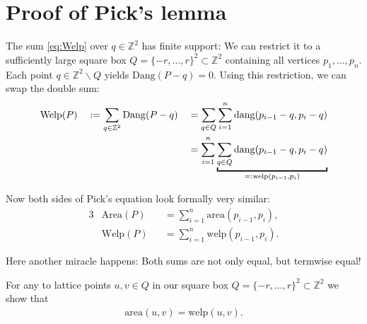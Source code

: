 \documentclass[a4paper]{amsart}
\numberwithin{equation}{section}
\theoremstyle{plain}
\theoremstyle{definition}
\newcommand{\Z}{\mathbb{Z}}
\newcommand{\minus}{\smallsetminus}
\newcommand{\area}{\mathrm{area}}
\newcommand{\Area}{\mathrm{Area}}
\newcommand{\dang}{\mathrm{dang}}
\newcommand{\Dang}{\mathrm{Dang}}
\newcommand{\welp}{\mathrm{welp}}
\newcommand{\Welp}{\mathrm{Welp}}
\begin{document}
\section{Proof of Pick's lemma}

The sum \eqref{eq:Welp} over $q \in \Z^2$ has finite support:
We can restrict it to a sufficiently large
square box $Q = \{-r,\ldots,r\}^2 \subset \Z^2$
containing all vertices $p_1,\ldots,p_n$.
Each point $q \in \Z^2 \minus Q$ yields $\Dang(P-q) = 0$.
Using this restriction, we can swap the double sum: %
\begin{alignat}{3}
  & \Welp(P)
  && := \sum_{q \in \Z^2} \Dang(P-q)
  && = \sum_{q \in Q} \sum_{i=1}^n \dang(p_{i-1}-q, p_i-q) 
  \\ \notag & && && = \sum_{i=1}^n
  \underbracket{ \sum_{q \in Q} \dang(p_{i-1}-q, p_i-q) }_{\normalsize =: \welp(p_{i-1},p_i)}
\end{alignat}

Now both sides of Pick's equation look formally very similar:
\begin{alignat}{3}
  & \Area(P) && = \sum_{i=1}^{n} \area(p_{i-1},p_i) ,
  \\
  & \Welp(P) && = \sum_{i=1}^n \welp(p_{i-1},p_i) .
\end{alignat}

Here another miracle happens:
Both sums are not only equal, but termwise equal!

For any to lattice points $u,v \in Q$
in our square box $Q = \{-r,\ldots,r\}^2 \subset \Z^2$
we show that
\begin{align}
  \area(u,v) = \welp(u,v) .
\end{align}
\end{document}
